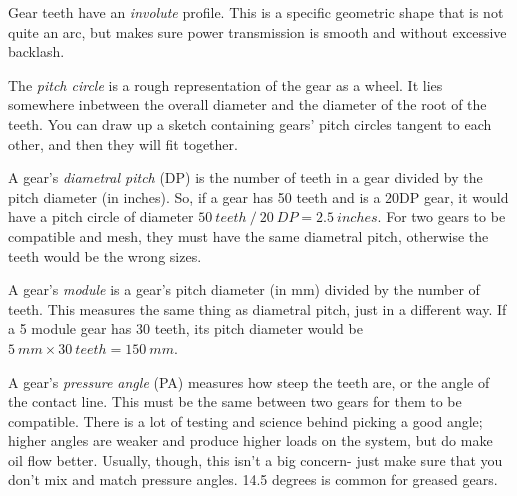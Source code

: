 \documentclass[10pt,letterpaper]{book}
\begin{document}
\begin{asparaenum}[a)]
	\item Gear teeth have an \textit{involute} profile. This is a specific geometric shape that is not quite an arc, but makes sure power transmission is smooth and without excessive backlash.
	\item The \textit{pitch circle} is a rough representation of the gear as a wheel. It lies somewhere inbetween the overall diameter and the diameter of the root of the teeth. You can draw up a sketch containing gears' pitch circles tangent to each other, and then they will fit together.
	\item A gear's \textit{diametral pitch} (DP) is the number of teeth in a gear divided by the pitch diameter (in inches). So, if a gear has 50 teeth and is a 20DP gear, it would have a pitch circle of diameter $50 \ teeth \ / \ 20 \ DP = 2.5 \ inches$. For two gears to be compatible and mesh, they must have the same diametral pitch, otherwise the teeth would be the wrong sizes.
	\item A gear's \textit{module} is a gear's pitch diameter (in mm) divided by the number of teeth. This measures the same thing as diametral pitch, just in a different way. If a 5 module gear has 30 teeth, its pitch diameter would be $5 \ mm \times 30 \ teeth = 150 \ mm$.
	\item A gear's \textit{pressure angle} (PA) measures how steep the teeth are, or the angle of the contact line. This must be the same between two gears for them to be compatible. There is a lot of testing and science behind picking a good angle; higher angles are weaker and produce higher loads on the system, but do make oil flow better. Usually, though, this isn't a big concern- just make sure that you don't mix and match pressure angles. 14.5 degrees is common for greased gears.
\end{asparaenum}
\end{document}
